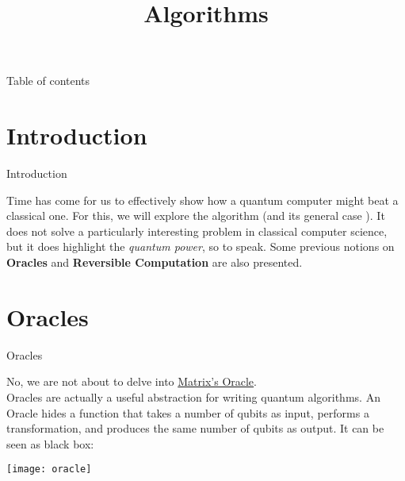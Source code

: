 \documentclass[aspectratio=43]{beamer}
\title{\q Algorithms}
\begin{document}
\begin{frame}
	\titlepage
\end{frame}


\begin{frame}{Table of contents}
	\begin{card}
		\tableofcontents
	\end{card}
\end{frame}


\section{Introduction}
\begin{frame}{Introduction}
    \begin{card}
        Time has come for us to effectively show how a quantum computer might beat a classical one. For this, we will explore the \ds algorithm (and its general case \djs). It does not solve a particularly interesting problem in classical computer science, but it does highlight the \textit{quantum power}, so to speak. Some previous notions on \textbf{\q Oracles} and \textbf{Reversible Computation} are also presented.
    \end{card}
\pagenumber
\end{frame}

\section{\q Oracles}
\begin{frame}{\q Oracles}
\begin{card}
    No, we are not about to delve into  \href{https://en.wikipedia.org/wiki/The_Oracle_(The_Matrix)}{Matrix's Oracle}.\\
    \q Oracles are actually a useful abstraction for writing quantum algorithms. An Oracle hides a function that takes a number of qubits as input, performs a transformation, and produces the same number of qubits as output. It can be seen as black box:
    \begin{center}
        \texttt{[image: oracle]}
    \end{center}
\end{card}
\pagenumber
\end{frame}
\end{document}
